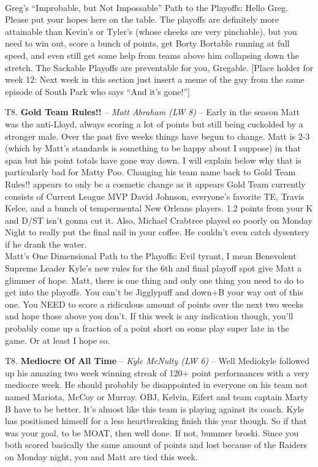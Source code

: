 \documentclass[11pt,letterpaper]{article}
\begin{document}
\begin{etaremune}
\medskip\\ Greg's ``Improbable, but Not Impossable'' Path to the Playoffs: Hello Greg. Please put your hopes here on the table. The playoffs are definitely more attainable than Kevin's or Tyler's (whose cheeks are very pinchable), but you need to win out, score a bunch of points, get Borty Bortable running at full speed, and even still get some help from teams above him collapsing down the stretch. The Sackable Playoffs are preventable for you, Gregable. 
[Place holder for week 12: Next week in this section just insert a meme of the guy from the same episode of South Park who says ``And it's gone!'']
\newpage
\item[T8.] \textbf{Gold Team Rules!!} -- \textit{Matt Abraham (LW 8)} -- Early in the season Matt was the anti-Lloyd, always scoring a lot of points but still being cuckolded by a stronger male. Over the past five weeks things have begun to change. Matt is 2-3 (which by Matt's standards is something to be happy about I suppose) in that span but his point totals have gone way down. I will explain below why that is particularly bad for Matty Poo. Changing his team name back to Gold Team Rules!! appears to only be a cosmetic change as it appears Gold Team currently consists of Current League MVP David Johnson, everyone's favorite TE, Travis Kelce, and a bunch of tempermental New Orleans players. 1.2 points from your K and D/ST isn't gonna cut it. Also, Michael Crabtree played so poorly on Monday Night to really put the final nail in your coffee. He couldn't even catch dysentery if he drank the water.
\medskip\\ Matt's One Dimensional Path to the Playoffs: Evil tyrant, I mean Benevolent Supreme Leader Kyle's new rules for the 6th and final playoff spot give Matt a glimmer of hope. Matt, there is one thing and only one thing you need to do to get into the playoffs. You can't be Jigglypuff and down+B your way out of this one. You NEED to score a ridiculous amount of points over the next two weeks and hope those above you don't. If this week is any indication though, you'll probably come up a fraction of a point short on some play super late in the game. Or at least I hope so.
\item[T8.] \textbf{Mediocre Of All Time} -- \textit{Kyle McNulty (LW 6)} -- Well Mediokyle followed up his amazing two week winning streak of 120+ point performances with a very mediocre week. He should probably be disappointed in everyone on his team not named Mariota, McCoy or Murray. OBJ, Kelvin, Eifert and team captain Marty B have to be better. It's almost like this team is playing against its coach. Kyle has positioned himself for a less heartbreaking finish this year though. So if that was your goal, to be MOAT, then well done. If not, bummer broski. Since you both scored basically the same amount of points and lost because of the Raiders on Monday night, you and Matt are tied this week. 

\end{etaremune}
\end{document}
